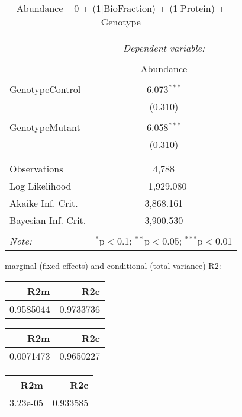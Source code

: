 \documentclass[11pt]{report}
\begin{document}
\begin{table}[!htbp] \centering 
  \caption{Abundance ~ 0 + (1|BioFraction) + (1|Protein) + Genotype} 
  \label{} 
\begin{tabular}{@{\extracolsep{5pt}}lc} 
\\[-1.8ex]\hline 
\hline \\[-1.8ex] 
 & \multicolumn{1}{c}{\textit{Dependent variable:}} \\ 
\cline{2-2} 
\\[-1.8ex] & Abundance \\ 
\hline \\[-1.8ex] 
 GenotypeControl & 6.073$^{***}$ \\ 
  & (0.310) \\ 
  & \\ 
 GenotypeMutant & 6.058$^{***}$ \\ 
  & (0.310) \\ 
  & \\ 
\hline \\[-1.8ex] 
Observations & 4,788 \\ 
Log Likelihood & $-$1,929.080 \\ 
Akaike Inf. Crit. & 3,868.161 \\ 
Bayesian Inf. Crit. & 3,900.530 \\ 
\hline 
\hline \\[-1.8ex] 
\textit{Note:}  & \multicolumn{1}{r}{$^{*}$p$<$0.1; $^{**}$p$<$0.05; $^{***}$p$<$0.01} \\ 
\end{tabular} 
\end{table} 
marginal (fixed effects) and conditional (total variance) R2:

\begin{tabular}{r|r}
\hline
R2m & R2c\\
\hline
0.9585044 & 0.9733736\\
\hline
\end{tabular}

\begin{tabular}{r|r}
\hline
R2m & R2c\\
\hline
0.0071473 & 0.9650227\\
\hline
\end{tabular}

\begin{tabular}{r|r}
\hline
R2m & R2c\\
\hline
3.23e-05 & 0.933585\\
\hline
\end{tabular}
\end{document}
